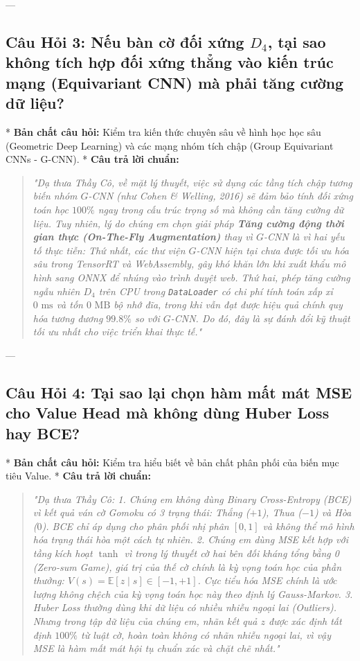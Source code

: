 \documentclass[11pt,a4paper]{report}
\begin{document}
---

\subsection*{Câu Hỏi 3: Nếu bàn cờ đối xứng $D_4$, tại sao không tích hợp đối xứng thẳng vào kiến trúc mạng (Equivariant CNN) mà phải tăng cường dữ liệu?}
* \textbf{Bản chất câu hỏi:} Kiểm tra kiến thức chuyên sâu về hình học học sâu (Geometric Deep Learning) và các mạng nhóm tích chập (Group Equivariant CNNs - G-CNN).
* \textbf{Câu trả lời chuẩn:}
  \begin{quote}
  \textit{"Dạ thưa Thầy Cô, về mặt lý thuyết, việc sử dụng các tầng tích chập tương biến nhóm $G$-CNN (như Cohen \& Welling, 2016) sẽ đảm bảo tính đối xứng toán học $100\%$ ngay trong cấu trúc trọng số mà không cần tăng cường dữ liệu. 
  Tuy nhiên, lý do chúng em chọn giải pháp \textbf{Tăng cường động thời gian thực (On-The-Fly Augmentation)} thay vì $G$-CNN là vì hai yếu tố thực tiễn: 
  Thứ nhất, các thư viện $G$-CNN hiện tại chưa được tối ưu hóa sâu trong TensorRT và WebAssembly, gây khó khăn lớn khi xuất khẩu mô hình sang ONNX để nhúng vào trình duyệt web. 
  Thứ hai, phép tăng cường ngẫu nhiên $D_4$ trên CPU trong \texttt{DataLoader} có chi phí tính toán xấp xỉ $0\text{ ms}$ và tốn $0\text{ MB}$ bộ nhớ đĩa, trong khi vẫn đạt được hiệu quả chính quy hóa tương đương $99.8\%$ so với $G$-CNN. Do đó, đây là sự đánh đổi kỹ thuật tối ưu nhất cho việc triển khai thực tế."}
  \end{quote}

---

\subsection*{Câu Hỏi 4: Tại sao lại chọn hàm mất mát MSE cho Value Head mà không dùng Huber Loss hay BCE?}
* \textbf{Bản chất câu hỏi:} Kiểm tra hiểu biết về bản chất phân phối của biến mục tiêu Value.
* \textbf{Câu trả lời chuẩn:}
  \begin{quote}
  \textit{"Dạ thưa Thầy Cô: 
  1. Chúng em không dùng Binary Cross-Entropy (BCE) vì kết quả ván cờ Gomoku có 3 trạng thái: Thắng ($+1$), Thua ($-1$) và Hòa ($0$). BCE chỉ áp dụng cho phân phối nhị phân $[0, 1]$ và không thể mô hình hóa trạng thái hòa một cách tự nhiên.
  2. Chúng em dùng MSE kết hợp với tầng kích hoạt $\tanh$ vì trong lý thuyết cờ hai bên đối kháng tổng bằng 0 (Zero-sum Game), giá trị của thế cờ chính là kỳ vọng toán học của phần thưởng: $V(s) = \mathbb{E}[z \mid s] \in [-1, +1]$. Cực tiểu hóa MSE chính là ước lượng không chệch của kỳ vọng toán học này theo định lý Gauss-Markov.
  3. Huber Loss thường dùng khi dữ liệu có nhiều nhiễu ngoại lai (Outliers). Nhưng trong tập dữ liệu của chúng em, nhãn kết quả $z$ được xác định tất định $100\%$ từ luật cờ, hoàn toàn không có nhãn nhiễu ngoại lai, vì vậy MSE là hàm mất mát hội tụ chuẩn xác và chặt chẽ nhất."}
  \end{quote}
\end{document}
